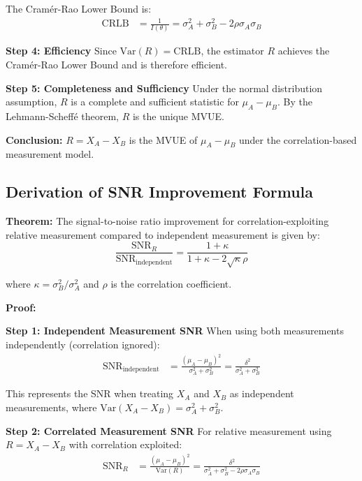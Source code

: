 The Cramér-Rao Lower Bound is:
\begin{align}
\text{CRLB} &= \frac{1}{I(\theta)} = \sigma_A^2 + \sigma_B^2 - 2\rho\sigma_A\sigma_B
\end{align}

\textbf{Step 4: Efficiency}
Since $\text{Var}(R) = \text{CRLB}$, the estimator $R$ achieves the Cramér-Rao Lower Bound and is therefore efficient.

\textbf{Step 5: Completeness and Sufficiency}
Under the normal distribution assumption, $R$ is a complete and sufficient statistic for $\mu_A - \mu_B$. By the Lehmann-Scheffé theorem, $R$ is the unique MVUE.

\textbf{Conclusion:} $R = X_A - X_B$ is the MVUE of $\mu_A - \mu_B$ under the correlation-based measurement model.

\subsection{Derivation of SNR Improvement Formula}

\textbf{Theorem:} The signal-to-noise ratio improvement for correlation-exploiting relative measurement compared to independent measurement is given by:
\begin{equation}
\frac{\text{SNR}_R}{\text{SNR}_{\text{independent}}} = \frac{1 + \kappa}{1 + \kappa - 2\sqrt{\kappa}\rho}
\end{equation}

where $\kappa = \sigma_B^2/\sigma_A^2$ and $\rho$ is the correlation coefficient.

\textbf{Proof:}

\textbf{Step 1: Independent Measurement SNR}
When using both measurements independently (correlation ignored):
\begin{align}
\text{SNR}_{\text{independent}} &= \frac{(\mu_A - \mu_B)^2}{\sigma_A^2 + \sigma_B^2} = \frac{\delta^2}{\sigma_A^2 + \sigma_B^2}
\end{align}

This represents the SNR when treating $X_A$ and $X_B$ as independent measurements, where $\text{Var}(X_A - X_B) = \sigma_A^2 + \sigma_B^2$.

\textbf{Step 2: Correlated Measurement SNR}
For relative measurement using $R = X_A - X_B$ with correlation exploited:
\begin{align}
\text{SNR}_R &= \frac{(\mu_A - \mu_B)^2}{\text{Var}(R)} = \frac{\delta^2}{\sigma_A^2 + \sigma_B^2 - 2\rho\sigma_A\sigma_B}
\end{align}

